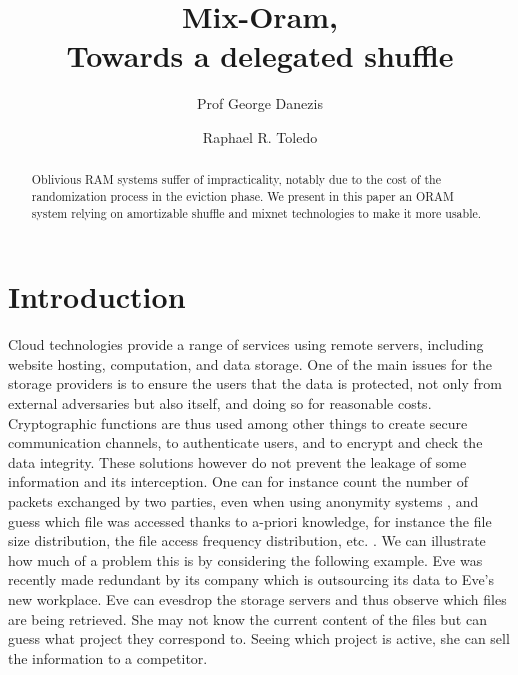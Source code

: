 \documentclass[english,oneside,twocolumn]{article}
\begin{document}
 

  \author[1]{Prof George Danezis}
  \author[2]{Raphael R. Toledo}


  \title{\huge Mix-Oram,\\ Towards a delegated shuffle}



  \begin{abstract}
{Oblivious RAM systems suffer of impracticality, notably due to the cost of the randomization process in the eviction phase.
We present in this paper an ORAM system relying on amortizable shuffle and mixnet technologies to make it more usable.}
\end{abstract}

\maketitle
\section{Introduction}
Cloud technologies provide a range of services using remote servers, including website hosting, computation, and data storage. One of the main issues for the storage providers is to ensure the users that the data is protected, not only from external adversaries but also itself, and doing so for reasonable costs. 
Cryptographic functions are thus used among other things to create secure communication channels, to authenticate users, and to encrypt and check the data integrity.
These solutions however do not prevent the leakage of some information and its interception. One can for instance count the number of packets exchanged by two parties, even when using anonymity systems \cite{murdoch2005}, and guess which file was accessed thanks to a-priori knowledge, for instance the file size distribution, the file access frequency distribution, etc. .
We can illustrate how much of a problem this is by considering the following example. Eve was recently made redundant by its company which is outsourcing its data to Eve's new workplace. Eve can evesdrop the storage servers and thus observe which files are being retrieved. She may not know the current content of the files but can guess what project they correspond to. Seeing which project is active, she can sell the information to a competitor.  
\end{document}
